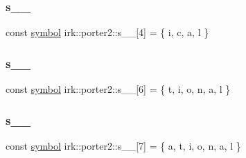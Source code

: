 \mbox{\label{namespaceirk_1_1porter2_a37a24540ee8bde6457769e7e5da54ee1}} 
\subsubsection{\texorpdfstring{s\+\_\+\_}{s\_6\_4}}
{\footnotesize\ttfamily const \mbox{\hyperlink{namespaceirk_1_1porter2_afd04c4eb58a1dabcf8f3ab2d7e9f9ed5}{symbol}} irk\+::porter2\+::s\+\_\+\_\mbox{[}4\mbox{]} = \{ \textquotesingle{}i\textquotesingle{}, \textquotesingle{}c\textquotesingle{}, \textquotesingle{}a\textquotesingle{}, \textquotesingle{}l\textquotesingle{} \}\hspace{0.3cm}{\ttfamily [static]}}

\mbox{\label{namespaceirk_1_1porter2_aaa5df8898e37c93a5fc62398b3f7aeb5}} 
\subsubsection{\texorpdfstring{s\+\_\+\_}{s\_6\_5}}
{\footnotesize\ttfamily const \mbox{\hyperlink{namespaceirk_1_1porter2_afd04c4eb58a1dabcf8f3ab2d7e9f9ed5}{symbol}} irk\+::porter2\+::s\+\_\+\_\mbox{[}6\mbox{]} = \{ \textquotesingle{}t\textquotesingle{}, \textquotesingle{}i\textquotesingle{}, \textquotesingle{}o\textquotesingle{}, \textquotesingle{}n\textquotesingle{}, \textquotesingle{}a\textquotesingle{}, \textquotesingle{}l\textquotesingle{} \}\hspace{0.3cm}{\ttfamily [static]}}

\mbox{\label{namespaceirk_1_1porter2_ae1f3ec4f83dbefc11a9b231e1ad15963}} 
\subsubsection{\texorpdfstring{s\+\_\+\_}{s\_6\_6}}
{\footnotesize\ttfamily const \mbox{\hyperlink{namespaceirk_1_1porter2_afd04c4eb58a1dabcf8f3ab2d7e9f9ed5}{symbol}} irk\+::porter2\+::s\+\_\+\_\mbox{[}7\mbox{]} = \{ \textquotesingle{}a\textquotesingle{}, \textquotesingle{}t\textquotesingle{}, \textquotesingle{}i\textquotesingle{}, \textquotesingle{}o\textquotesingle{}, \textquotesingle{}n\textquotesingle{}, \textquotesingle{}a\textquotesingle{}, \textquotesingle{}l\textquotesingle{} \}\hspace{0.3cm}{\ttfamily [static]}}


